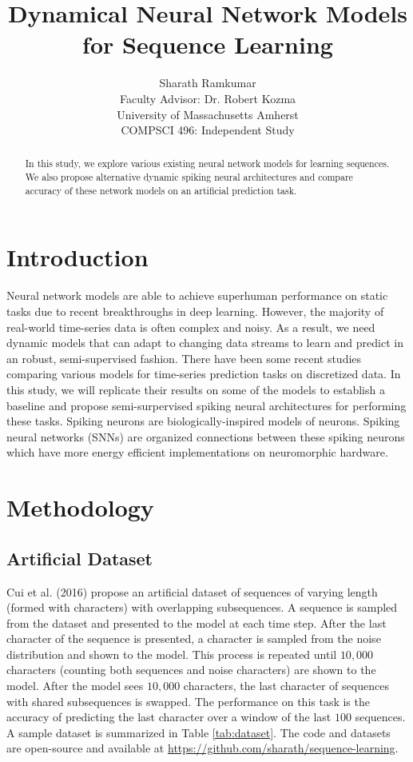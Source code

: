 \documentclass{article}
\title{Dynamical Neural Network Models\\for Sequence Learning}
\author{Sharath Ramkumar\\
Faculty Advisor: Dr. Robert Kozma\\University of Massachusetts Amherst\\COMPSCI 496: Independent Study}
\date{}
\begin{document}
\maketitle

\begin{abstract}
In this study, we explore various existing neural network models for learning sequences. We also propose alternative dynamic spiking neural architectures and compare accuracy of these network models on an artificial prediction task.
\end{abstract}

\section*{Introduction}

Neural network models are able to achieve superhuman performance on static tasks due to recent breakthroughs in deep learning. However, the majority of real-world time-series data is often complex and noisy. As a result, we need dynamic models that can adapt to changing data streams to learn and predict in an robust, semi-supervised fashion. There have been some recent studies comparing various models for time-series prediction tasks \cite{cui2016continuous} on discretized data. In this study, we will replicate their results on some of the models to establish a baseline and propose semi-surpervised spiking neural architectures for performing these tasks. Spiking neurons \cite{gerstner2002spiking} are biologically-inspired models of neurons. Spiking neural networks (SNNs) \cite{maass1997networks} are organized connections between these spiking neurons which have more energy efficient \cite{cruz2012energy} implementations on neuromorphic hardware.

\section*{Methodology}

\subsection*{Artificial Dataset}

Cui et al. (2016) propose an artificial dataset of sequences of varying length (formed with characters) with overlapping subsequences. A sequence is sampled from the dataset and presented to the model at each time step. After the last character of the sequence is presented, a character is sampled from the noise distribution and shown to the model. This process is repeated until $10,000$ characters (counting both sequences and noise characters) are shown to the model. After the model sees $10,000$ characters, the last character of sequences with shared subsequences is swapped. The performance on this task is the accuracy of predicting the last character over a window of the last $100$ sequences. A sample dataset is summarized in Table \ref{tab:dataset}.  The code and datasets are open-source and available at \href{https://github.com/sharath/sequence-learning}{https://github.com/sharath/sequence-learning}.
\end{document}
